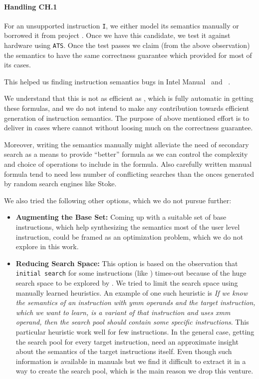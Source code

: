  \paragraph{Handling CH.1} For an unsupported instruction {\tt I}, we either
model its semantics  manually or borrowed it from project \Stoke.   Once we
have this candidate, we test it against hardware using {\tt ATS}.  Once the
test passes we claim (from the above observation) the semantics to have the
same correctness guarantee which \Strata provided for most of its cases.

This helped us finding instruction semantics bugs in Intel
Manual~\cite{} and \Stoke~\cite{BugStoke983}.

We understand that this is not as efficient as \Stoke, which is fully
automatic in getting these formulas, and we do not intend to make any
contribution towards efficient generation of instruction semantics. The
purpose of above mentioned effort is to deliver in cases where \Stoke cannot
without loosing much on the correctness guarantee. 

Moreover, writing the semantics manually might alleviate the need of
secondary search as a means to provide ``better'' formula as we can control
the complexity and choice of operations to include in the formula. Also
carefully written manual formula tend to need less number of conflicting
searches than the onces generated by random search engines like Stoke.

We also tried the following other options, which we do not pursue further:
\begin{itemize}
    \item \textbf{Augmenting the Base Set: }
    Coming up with a suitable set of base instructions, which help 
    synthesizing the semantics most of the user level instruction, could be framed 
    as an optimization problem, which we do not explore in this work.  
    
    \item \textbf{Reducing \Stoke Search Space: }This option is based
    on the observation that {\tt initial search} for some instructions (like
    ) times-out because of the
    huge search space to be explored by \Stoke. We tried to limit the search
    space using manually learned heuristics. An example of one such heuristic is
    \emph{ If we know the semantics of an instruction with ymm operands and the
        target instruction, which we want to learn, is a variant of that
        instruction and uses xmm operand, then the search pool should contain
        some specific instructions}. This particular heuristic  work well for few
    instructions. In the general case, getting the search pool for every
    target instruction, need an approximate insight about the semantics of
    the target instructions itself. Even though such information is available
    in manuals but we find it difficult to extract it in a way to create the
    search pool, which is the main reason we drop this venture.
\end{itemize} 

